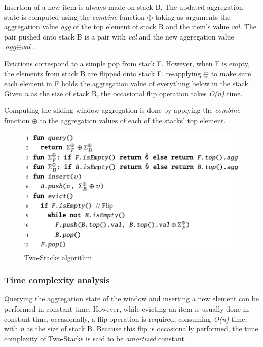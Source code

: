 Insertion of a new item is always made on stack B. The updated aggregation state is computed using the \textit{combine} function $\oplus$ taking as arguments the aggregation value \textit{agg} of the top element of stack B and the item's value \textit{val}. The pair pushed onto stack B is a pair with \textit{val} and the new aggregation value $\textit{agg} \oplus \textit{val}$.

Evictions correspond to a simple pop from stack F. However, when F is empty, the elements from stack B are flipped onto stack F, re-applying $\oplus$ to make sure each element in F holds the aggregation value of everything below in the stack. Given \textit{n} as the size of stack B, the occasional flip operation takes \textit{O(n)} time.

Computing the sliding window aggregation is done by applying the \textit{combine} function $\oplus$ to the aggregation values of each of the stacks' top element. 

\begin{figure}[!htb]
    \begin{center}
      \includegraphics[scale=0.45]{figures/2-stacks.png}
      \caption{Two-Stacks algorithm}
      \label{fig:pseudo-2-stacks}
    \end{center}
\end{figure}

\subsubsection*{Time complexity analysis}
Querying the aggregation state of the window and inserting a new element can be performed in constant time. However, while evicting an item is usually done in constant time, occasionally, a flip operation is required, consuming \textit{O(n)} time, with \textit{n} as the size of stack B. Because this flip is occasionally performed, the time complexity of Two-Stacks is said to be \textit{amortized} constant.


